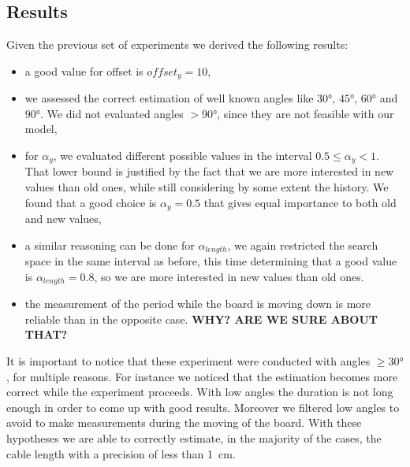 \subsection{Results}
Given the previous set of experiments we derived the following results:
\begin{itemize}
	\item a good value for offset is $offset_y = 10$,
	\item we assessed the correct estimation of well known angles like $30\si{\degree}$, $45\si{\degree}$, $60\si{\degree}$ and $90\si{\degree}$. We did not evaluated angles $> 90\si{\degree}$, since they are not feasible with our model,
	\item for $\alpha_y$, we evaluated different possible values in the interval $0.5 \leq \alpha_y < 1 $. That lower bound is justified by the fact that we are more interested in new values than old ones, while still considering by some extent the history. We found that a good choice is $\alpha_y = 0.5$ that gives equal importance to both old and new values,
	\item a similar reasoning can be done for $\alpha_{length}$, we again restricted the search space in the same interval as before, this time determining that a good value is $\alpha_{length} = 0.8$, so we are more interested in new values than old ones.
	\item the measurement of the period while the board is moving down is more reliable than in the opposite case. \textbf{WHY? ARE WE SURE ABOUT THAT?}
\end{itemize}
It is important to notice that these experiment were conducted with angles $\geq 30\si{\degree}$, for multiple reasons. For instance we noticed that the estimation becomes more correct while the experiment proceeds. With low angles the duration is not long enough in order to come up with good results. Moreover we filtered low angles to avoid to make measurements during the moving of the board.
With these hypotheses we are able to correctly estimate, in the majority of the cases, the cable length with a precision of less than \SI{1}{\cm}.

